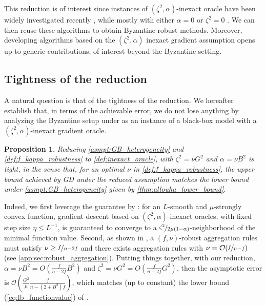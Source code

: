 \documentclass{article}
\newcommand{\cO}{\mathcal{O}}
\theoremstyle{plain}
\newtheorem{proposition}[theorem]{Proposition}
\theoremstyle{definition}
\theoremstyle{remark}
\begin{document}
This reduction is of interest since instances of $(\zeta^2,\alpha)$-inexact oracle have been widely investigated recently \citep{ajalloeian2020convergence}, while mostly with either $\alpha=0$ or $\zeta^2 =0$ \citep{de2020worst, cyrus2018robust, vasin2023accelerated}. We can then reuse these algorithms to obtain Byzantine-robust methods. Moreover, developing algorithms based on the $(\zeta^2,\alpha)$ inexact gradient assumption opens up to generic contributions, of interest beyond the Byzantine setting. 

\subsection{Tightness of the reduction}
\label{subsec:tightness}
A natural question is that of the tightness of the reduction. We hereafter establish that, in terms of the achievable error,  we do not  lose anything by analyzing the Byzantine setup under  as an instance of a black-box model with a $(\zeta^2,\alpha)$-inexact gradient oracle. 


\begin{proposition}
Reducing \cref{asmpt:GB_heterogeneity} and \cref{def:f_kappa_robustness} to \cref{def:inexact_oracle}, with  $\zeta^2 = \nu G^2$ and $\alpha = \nu B^2$ is tight, in the sense that,  for an optimal $\nu$ in \cref{def:f_kappa_robustness},  the upper bound achieved by GD under the reduced assumption matches the lower bound under \cref{asmpt:GB_heterogeneity} given by \cref{thm:allouha_lower_bound}.
\end{proposition} 

Indeed, we first leverage the guarantee by \citet{ajalloeian2020convergence}: for an $L$-smooth and $\mu$-strongly convex function, gradient descent based on $(\zeta^2,\alpha)$-inexact oracles,  with fixed step size $\eta\le L^{-1}$, is guaranteed to converge to a $\nicefrac{\zeta^2}{2\mu(1-\alpha)}$-neighborhood of the minimal function value. Second, as shown in \citet{allouah2023fixing}, a $(f,\nu)$-robust aggregation rules must satisfy $\nu \ge \nicefrac{f}{n-2f}$ and there exists aggregation rules with $\nu = \cO(\nicefrac{f}{n-f})$ (see \cref{app:sec:robust_aggregation}). Putting things together, with our reduction, $\alpha = \nu B^2= O(\frac{f}{n-2f}B^2)$ and $\zeta^2 = \nu G^2= O(\frac{f}{n-2f}G^2)$, then the asymptotic error is $\cO(\frac{G^2}{\mu}\frac{f }{ n-(2+B^2) f})$, which matches (up to constant) the lower bound (\ref{eq:lb_functionvalue}) of .
\end{document}
